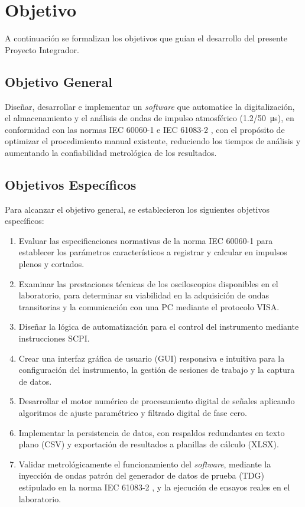 \section{Objetivo}
\label{sec:objetivos}

A continuación se formalizan los objetivos que guían el desarrollo del presente Proyecto Integrador.

\subsection{Objetivo General}
\label{subsec:objetivo_general}

Diseñar, desarrollar e implementar un \emph{software} que automatice la digitalización, el almacenamiento y el análisis de ondas de impulso atmosférico (\qty[parse-numbers=false]{1.2/50}{\micro\second}), en conformidad con las normas IEC 60060-1 \cite{iec60060_1} e IEC 61083-2 \cite{iec61083_2}, con el propósito de optimizar el procedimiento manual existente, reduciendo los tiempos de análisis y aumentando la confiabilidad metrológica de los resultados.

\subsection{Objetivos Específicos}
\label{subsec:objetivos_especificos}

Para alcanzar el objetivo general, se establecieron los siguientes objetivos específicos:

\begin{enumerate}
    \item Evaluar las especificaciones normativas de la norma IEC 60060-1 \cite{iec60060_1} para establecer los parámetros característicos a registrar y calcular en impulsos plenos y cortados.
    \item Examinar las prestaciones técnicas de los osciloscopios disponibles en el laboratorio, para determinar su viabilidad en la adquisición de ondas transitorias y la comunicación con una PC mediante el protocolo VISA.
    \item Diseñar la lógica de automatización para el control del instrumento mediante instrucciones SCPI.
    \item Crear una interfaz gráfica de usuario (GUI) responsiva e intuitiva para la configuración del instrumento, la gestión de sesiones de trabajo y la captura de datos.
    \item Desarrollar el motor numérico de procesamiento digital de señales aplicando algoritmos de ajuste paramétrico y filtrado digital de fase cero.
    \item Implementar la persistencia de datos, con respaldos redundantes en texto plano (CSV) y exportación de resultados a planillas de cálculo (XLSX).
    \item Validar metrológicamente el funcionamiento del \emph{software}, mediante la inyección de ondas patrón del generador de datos de prueba (TDG) estipulado en la norma IEC 61083-2 \cite{iec61083_2}, y la ejecución de ensayos reales en el laboratorio.
\end{enumerate}

